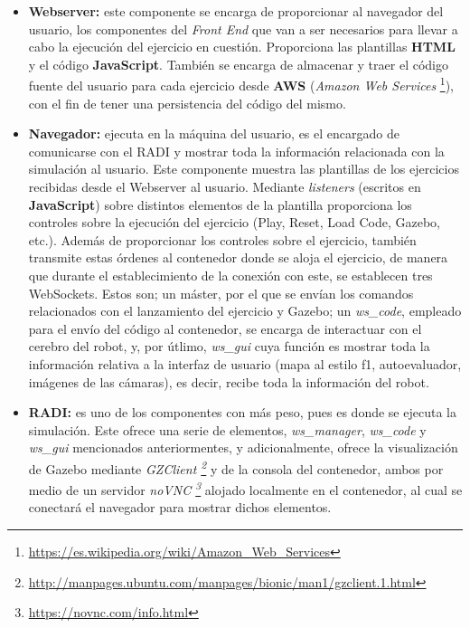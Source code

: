 \documentclass[a4paper, 12pt]{book}
\begin{document}
\begin{itemize}
\item \textbf{Webserver:} este componente se encarga de proporcionar al navegador del usuario, los componentes del \emph{Front End} que van a ser  necesarios para llevar a cabo la ejecución del ejercicio en cuestión. Proporciona las plantillas \textbf{HTML} y el código \textbf{JavaScript}. También se encarga de almacenar y traer el código fuente del usuario para cada ejercicio desde \textbf{AWS} (\emph{Amazon Web Services} \footnote{\url{https://es.wikipedia.org/wiki/Amazon_Web_Services}}), con el fin de tener una persistencia del código del mismo.

\item \textbf{Navegador:} ejecuta en la máquina del usuario, es el encargado de comunicarse con el RADI y mostrar toda la información relacionada con la simulación al usuario. Este componente muestra las plantillas de los ejercicios recibidas desde el Webserver al usuario. Mediante \emph{listeners} (escritos en \textbf{JavaScript}) sobre distintos elementos de la plantilla proporciona los controles sobre la ejecución del ejercicio (Play, Reset, Load Code, Gazebo, etc.). Además de proporcionar los controles sobre el ejercicio, también transmite estas órdenes al contenedor donde se aloja el ejercicio, de manera que durante el establecimiento de la conexión con este, se establecen tres WebSockets. Estos son; un máster, por el que se envían los comandos relacionados con el lanzamiento del ejercicio y Gazebo; un \emph{ws\_code}, empleado para el envío del código al contenedor, se encarga de interactuar con el cerebro del robot, y, por útlimo, \emph{ws\_gui} cuya función es mostrar toda la información relativa a la interfaz de usuario (mapa al estilo f1, autoevaluador, imágenes de las cámaras), es decir, recibe toda la información del robot.

\item \textbf{RADI:} es uno de los componentes con más peso, pues es donde se ejecuta la simulación. Este ofrece una serie de elementos,  \emph{ws\_manager}, \emph{ws\_code} y \emph{ws\_gui} mencionados anteriormentes, y adicionalmente, ofrece la visualización de Gazebo mediante \emph{GZClient \footnote{\url{http://manpages.ubuntu.com/manpages/bionic/man1/gzclient.1.html}}} y de la consola del contenedor, ambos por medio de un servidor \emph{noVNC \footnote{\url{https://novnc.com/info.html}}} alojado localmente en el contenedor, al cual se conectará el navegador para mostrar dichos elementos.
\end{itemize}
\end{document}
